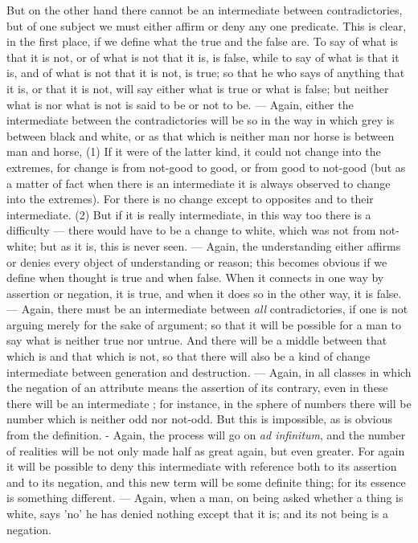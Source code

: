 But on the other hand there cannot be an intermediate between contradictories, but of one subject we must either affirm or deny any one predicate. This is clear, in the first place, if we define what the true and the false are. To say of what is that it is not, or of what is not that it is, is false, while to say of what is that it is, and of what is not that it is not, is true; so that he who says of anything that it is, or that it is not, will say either what is true or what is false; but neither what is nor what is not is said to be or not to be. — Again, either the intermediate between the contradictories will be so in the way in which grey is between black and white, or as that which is neither man nor horse is between man and horse, (1) If it were of the latter kind, it could not change into the extremes, for change is from not-good to good, or from good to not-good (but as a matter of fact when there is an intermediate it is always observed to change into the extremes). For there is no change except to opposites and to their intermediate. (2) But if it is really intermediate, in this way too there is a difficulty — there would have to be a change to white, which was not from not-white; but as it is, this is never seen. — Again, the understanding either affirms or denies every object of understanding or reason; this becomes obvious if we define when thought is true and when false. When it connects in one way by assertion or negation, it is true, and when it does so in the other way, it is false. — Again, there must be an intermediate between \emph{all} contradictories, if one is not arguing merely for the sake of argument; so that it will be possible for a man to say what is neither true nor untrue. And there will be a middle between that which is and that which is not, so that there will also be a kind of change intermediate between generation and destruction. — Again, in all classes in which the negation of an attribute means the assertion of its contrary, even in these there will be an intermediate ; for instance, in the sphere of numbers there will be number which is neither odd nor not-odd. But this is impossible, as is obvious from the definition. - Again, the process will go on \emph{ad infinitum}, and the number of realities will be not only made half as great again, but even greater. For again it will be possible to deny this intermediate with reference both to its assertion and to its negation, and this new term will be some definite thing; for its essence is something different. — Again, when a man, on being asked whether a thing is white, says 'no' he has denied nothing except that it is; and its not being is a negation.

